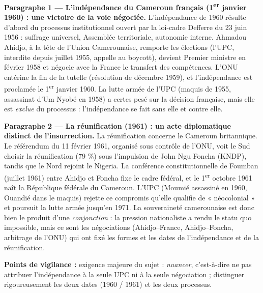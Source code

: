 \documentclass[11pt]{article}
\begin{document}
\begin{corrige}
\textbf{Paragraphe 1 — L'indépendance du Cameroun français (1\textsuperscript{er} janvier 1960) : une victoire de la voie négociée.} L'indépendance de 1960 résulte d'abord du processus institutionnel ouvert par la loi-cadre Defferre du 23 juin 1956 : suffrage universel, Assemblée territoriale, autonomie interne. Ahmadou Ahidjo, à la tête de l'Union Camerounaise, remporte les élections (l'UPC, interdite depuis juillet 1955, appelle au boycott), devient Premier ministre en février 1958 et négocie avec la France le transfert des compétences. L'ONU entérine la fin de la tutelle (résolution de décembre 1959), et l'indépendance est proclamée le 1\textsuperscript{er} janvier 1960. La lutte armée de l'UPC (maquis de 1955, assassinat d'Um Nyobé en 1958) a certes pesé sur la décision française, mais elle est \emph{exclue} du processus : l'indépendance se fait sans elle et contre elle.

\textbf{Paragraphe 2 — La réunification (1961) : un acte diplomatique distinct de l'insurrection.} La réunification concerne le Cameroun britannique. Le référendum du 11 février 1961, organisé sous contrôle de l'ONU, voit le Sud choisir la réunification (79 \%) sous l'impulsion de John Ngu Foncha (KNDP), tandis que le Nord rejoint le Nigeria. La conférence constitutionnelle de Foumban (juillet 1961) entre Ahidjo et Foncha fixe le cadre fédéral, et le 1\textsuperscript{er} octobre 1961 naît la République fédérale du Cameroun. L'UPC (Moumié assassiné en 1960, Ouandié dans le maquis) rejette ce compromis qu'elle qualifie de « néocolonial » et poursuit la lutte armée jusqu'en 1971. La souveraineté camerounaise est donc bien le produit d'une \emph{conjonction} : la pression nationaliste a rendu le statu quo impossible, mais ce sont les négociations (Ahidjo--France, Ahidjo--Foncha, arbitrage de l'ONU) qui ont fixé les formes et les dates de l'indépendance et de la réunification.

\textbf{Points de vigilance :} exigence majeure du sujet : \emph{nuancer}, c'est-à-dire ne pas attribuer l'indépendance à la seule UPC ni à la seule négociation ; distinguer rigoureusement les deux dates (1960 / 1961) et les deux processus.
\end{corrige}
\end{document}
